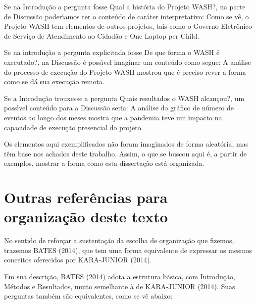 \documentclass[
12pt,		%
openright,	%
twoside,  %
a4paper,			%
chapter=TITLE,		%
english,			%
french,				%
spanish,			%
brazil				%
]{USPSC-classe/USPSC_RedarTex}
\begin{document}
\begin{alineas}
\item Se na Introdu\c{c}\~ao a pergunta fosse \textquotedbl Qual a hist\'oria do Projeto WASH?\textquotedbl , na parte de Discuss\~ao poder\'{\i}amos ter o conte\'udo de car\'ater interpretativo: \textquotedbl Como se v\^e, o Projeto WASH tem elementos de outros projetos, tais como o Governo Eletr\^onico de Servi\c{c}o de Atendimento ao Cidad\~ao e One Laptop per Child\textquotedbl .
\item Se na introdu\c{c}\~ao a pergunta explicitada fosse \textquotedbl De que forma o WASH \'e executado?\textquotedbl , na Discuss\~ao \'e poss\'{\i}vel imaginar um conte\'udo como segue: \textquotedbl A an\'alise do processo de execu\c{c}\~ao do Projeto WASH mostrou que \'e preciso rever a forma como se d\'a sua execu\c{c}\~ao remota\textquotedbl .
\item Se a Introdu\c{c}\~ao trouxesse a pergunta \textquotedbl Quais resultados o WASH alcan\c{c}ou?\textquotedbl , um poss\'{\i}vel conte\'udo para a Discuss\~ao seria: \textquotedbl A an\'alise do gr\'afico de n\'umero de eventos ao longo dos meses mostra que a pandemia teve um impacto na capacidade de execu\c{c}\~ao presencial do projeto.\textquotedbl 
\end{alineas}

Os elementos aqui exemplificados n\~ao foram imaginados de forma aleat\'oria, mas t\^em base nos achados deste trabalho. Assim, o que se buscou aqui \'e, a partir de exemplos, mostrar a forma como esta disserta\c{c}\~ao est\'a organizada.










\section[Outras refer\^encias para organiza\c{c}\~ao deste texto]{Outras refer\^encias para organiza\c{c}\~ao deste texto}\label{Outras refer\^encias para organiza\c{c}\~ao deste texto}
No sentido de refor\c{c}ar a sustenta\c{c}\~ao da escolha de organiza\c{c}\~ao que fizemos, trazemos  BATES (2014), que tem uma forma equivalente de expressar os mesmos conceitos oferecidos por  KARA-JUNIOR (2014).










Em sua descri\c{c}\~ao, BATES (2014)  adota a estrutura b\'asica, com \textquotedbl Introdu\c{c}\~ao, M\'etodos e Resultados\textquotedbl , muito semelhante \`a de KARA-JUNIOR (2014). Suas perguntas tamb\'em s\~ao equivalentes, como se v\^e abaixo:
\end{document}
